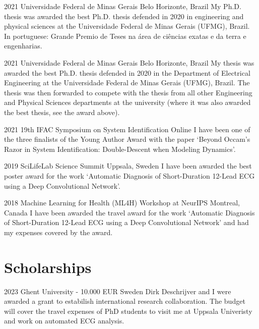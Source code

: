 \documentclass[10pt,letterpaper]{article} %
\begin{document}
    { 2021 }
    { Universidade Federal de Minas Gerais }
    { Belo Horizonte, Brazil }
    { My Ph.D. thesis was awarded the best Ph.D. thesis defended in 2020 in engineering and physical sciences at the Universidade Federal de Minas Gerais (UFMG), Brazil. In portuguese: Grande Premio de Teses na área de ciências exatas e da terra e engenharias. }

    { 2021 }
    { Universidade Federal de Minas Gerais }
    { Belo Horizonte, Brazil }
    { My thesis was awarded the best Ph.D. thesis defended in 2020 in the Department of Electrical Engineering at the Universidade Federal de Minas Gerais (UFMG), Brazil. The thesis was then forwarded to compete with the thesis from all other Engineering and Physical Sciences departments at the university (where it was also awarded the best thesis, see the award above). }

    { 2021 }
    { 19th IFAC Symposium on System Identification }
    { Online }
    { I have been one of the three finalists of the Young Author Award with the paper `Beyond Occam’s Razor in System Identification:  Double-Descent when Modeling Dynamics'. }

    { 2019 }
    { SciLifeLab Science Summit }
    { Uppsala, Sweden }
    { I have been awarded the best poster award for the work `Automatic Diagnosis of Short-Duration 12-Lead ECG using a Deep Convolutional Network'. }

    { 2018 }
    { Machine Learning for Health (ML4H) Workshop at NeurIPS }
    { Montreal, Canada }
    { I have been awarded the travel award for the work `Automatic Diagnosis of Short-Duration 12-Lead ECG using a Deep Convolutional Network' and had my expenses covered by the award. }


\section*{Scholarships}


    { 2023 }
    { Ghent University - 10.000 EUR }
    { Sweden }
    { Dirk Deschrijver and I were awarded a grant to estabilish international research collaboration. The budget will cover the travel expenses of PhD students to visit me at Uppsala Univeristy and work on automated ECG analysis. }
\end{document}
